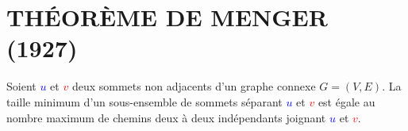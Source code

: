 
\section{THÉORÈME DE MENGER (1927)}

\begin{minipage}{\linewidth}
\begin{center}
\begin{minipage}{0.8\textwidth}
Soient \textcolor{blue}{$u$} et \textcolor{red}{$v$} deux sommets non adjacents d’un graphe connexe $G = (V,E)$. La taille minimum d’un sous-ensemble de sommets séparant \textcolor{blue}{$u$} et \textcolor{red}{$v$} est égale au nombre maximum de chemins deux à deux indépendants joignant \textcolor{blue}{$u$} et \textcolor{red}{$v$}.
\end{minipage}
\end{center}
\end{minipage}

